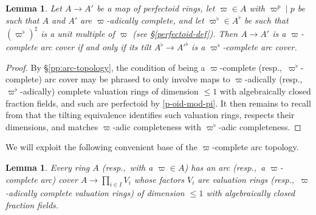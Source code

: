 \documentclass[11pt, reqno]{amsart}
\newcommand{\bZ}{\mathbb{Z}}
\newcommand{\ra}{\rightarrow}
\providecommand{\up}[1]{{\upshape(}#1{\upshape)}}
\providecommand{\uref}[1]{{\upshape\ref{#1}}}
\providecommand{\uS}{{\upshape\S}}
\newcommand{\m}{\item}
\newcommand{\blem}{\begin{lemma}}
\newcommand{\elem}{\end{lemma}}
\newcommand{\benum}{\begin{enumerate}[label={{\upshape(\alph*)}}]}
\newcommand{\eenum}{\end{enumerate}}
\newcommand{\lab}{\label}
\newcommand{\bpf}{\begin{proof}}
\newcommand{\epf}{\end{proof}}
\numberwithin{equation}{numberingbase}
\theoremstyle{thms}
\newtheorem{lemma}[numberingbase]{Lemma}
\theoremstyle{claims}
\theoremstyle{defs}
\theoremstyle{thms}
\theoremstyle{defs}
\theoremstyle{subsection-tweak}
\theoremstyle{subsection-tweak}
\begin{document}
\blem \label{arc-tilt}
Let $A \ra A'$ be a map of perfectoid rings, let $\varpi \in A$ with $\varpi^p \mid p$ be such that $A$ and $A'$ are $\varpi$-adically complete, and let $\varpi^\flat \in A^\flat$ be such that $(\varpi^\flat)^\sharp$ is a unit multiple of $\varpi$ \up{see \uS\uref{perfectoid-def}}. Then $A \ra A'$ is a $\varpi$-complete arc cover if and only if its tilt $A^\flat \ra A'^\flat$ is a $\varpi^\flat$-complete arc cover.
\elem

\bpf
By \S\ref{pp:arc-topology}, the condition of being a $\varpi$-complete (resp.,~$\varpi^\flat$-complete) arc cover may be phrased to only involve maps to $\varpi$-adically (resp.,~$\varpi^\flat$-adically) complete valuation rings of dimension $\le 1$ with algebraically closed fraction fields, and such are perfectoid by \eqref{p-oid-mod-pi}. It then remains to recall from  that the tilting equivalence identifies such valuation rings, respects their dimensions, and matches $\varpi$-adic completeness with $\varpi^\flat$-adic completeness. 
\epf








We will exploit the following convenient base of the $\varpi$-complete arc topology. 

\blem \label{lem:arc-base}
Every ring $A$ \up{resp.,~with a $\varpi \in A$} has an arc \up{resp.,~a $\varpi$-complete arc} cover $A \ra \prod_{i \in I} V_i$ whose factors $V_i$ are valuation rings \up{resp.,~$\varpi$-adically complete valuation rings} of dimension $\le 1$ with algebraically closed fraction fields. %
\elem
 
\end{document}
